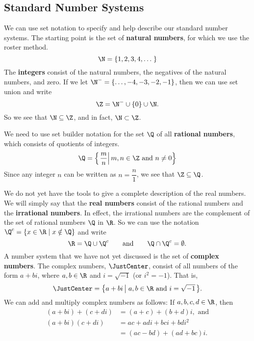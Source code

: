 \subsection*{Standard Number Systems}
We can use set notation to specify and help describe our standard number systems.  The starting point is the set of \textbf{natural numbers},
%
 for which we use the roster method.
\[
\N = \left\{ 1, 2, 3, 4, \ldots \;\right\}
\]
The \textbf{integers}
%
 consist of the natural numbers, the negatives of the natural numbers, and zero.  If we let $\N^- = \left\{ \ldots, -4, -3, -2, -1 \right\}$, then we can use set union and write
\[
\Z = \N^- \cup \left\{ 0 \right\} \cup \N.
\]
So we see that $\N \subseteq \Z$, and in fact, $\N \subset \Z$.

We need to use set builder notation for the set $\Q$ of all \textbf{rational numbers}, which consists of quotients of integers.
\[
\Q = \left\{ \left. \frac{m}{n}  \right| m, n \in \Z \text{ and } n \ne 0 \right\}
\]
Since any integer $n$ can be written as $n = \dfrac{n}{1}$, we see that $\Z \subseteq \Q$.  

We do not yet have the tools to give a complete description of the real numbers.
%
  We will simply say that the \textbf{real numbers} consist of the rational numbers and the \textbf{irrational numbers}.  In effect, the irrational numbers are the complement of the set of rational numbers $\Q$ in $\R$.  So 
%
  we can use the notation $\Q^c = \left\{ x \in \R \mid x \notin \Q \right\}$ and write
\[
\R = \Q \cup \Q^c \qquad \text{and} \qquad \Q \cap \Q^c = \emptyset.
\]
A number system that we have not yet discussed is the set of \textbf{complex numbers}.
%
  The complex numbers, $\C$,  consist of all numbers of the form $a + bi$, where $a, b \in \R$ and $i = \sqrt{-1}$ (or $i^2 = -1$).  That is,
\[
\C = \left\{  a + bi \left| \hskip3pt a, b \in \R \text{ and } i = \sqrt{-1} \right. \right\}\!.
\]
We can add and multiply complex numbers as follows:  If $a, b, c, d \in \R$, then
\[
\begin{aligned}
\left( a + bi \right) + \left( c + di \right) &= \left(a + c \right) + \left(b + d \right)i, \text{ and} \\
\left( a + bi \right) \left( c + di \right) &= ac + adi + bci + bdi^2 \\
                                            &= \left(ac - bd \right) + \left(ad + bc \right)i.
\end{aligned}
\]

\endinput

